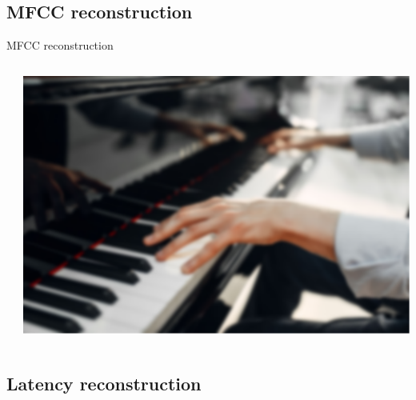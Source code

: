 \documentclass[aspectratio=169, 11pt]{beamer}
\begin{document}
\subsection{MFCC reconstruction}

\begin{frame}{MFCC reconstruction}
  \begin{columns}
    \begin{column}{0.5\textwidth}
      \centering
    \end{column}
    \begin{column}{0.5\textwidth}
      \includegraphics[width=\textwidth]{image/piano_blur1.png}
    \end{column}
  \end{columns}
\end{frame}

\subsection{Latency reconstruction}
\end{document}
